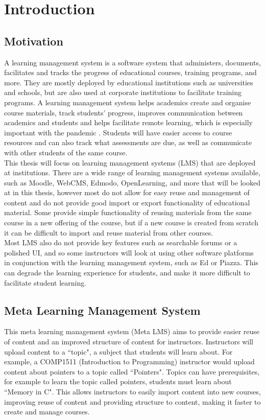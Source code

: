 \chapter{Introduction}\label{ch:intro}

\section{Motivation}
A learning management system is a software system that administers, documents, facilitates and tracks the progress of educational courses, training programs, and more. They are mostly deployed by educational institutions such as universities and schools, but are also used at corporate institutions to facilitate training programs\cite{lmsdefinition}. A learning management system helps academics create and organise course materials, track students' progress, improves communication between academics and students and helps facilitate remote learning, which is especially important with the pandemic \cite{lmsreasons}. Students will have easier access to course resources and can also track what assessments are due, as well as communicate with other students of the same course.\\

This thesis will focus on learning management systems (LMS) that are deployed at institutions. There are a wide range of learning management systems available, such as Moodle, WebCMS, Edmodo, OpenLearning, and more that will be looked at in this thesis, however most do not allow for easy reuse and management of content and do not provide good import or export functionality of educational material. Some provide simple functionality of reusing materials from the same course in a new offering of the course, but if a new course is created from scratch it can be difficult to import and reuse material from other courses.\\

Most LMS also do not provide key features such as searchable forums or a polished UI, and so some instructors will look at using other software platforms in conjunction with the learning management system, such as Ed or Piazza. This can degrade the learning experience for students, and make it more difficult to facilitate student learning.\\

\section{Meta Learning Management System}
This meta learning management system (Meta LMS) aims to provide easier reuse of content and an improved structure of content for instructors. Instructors will upload content to a ``topic", a subject that students will learn about. For example, a COMP1511 (Introduction to Programming) instructor would upload content about pointers to a topic called ``Pointers". Topics can have prerequisites, for example to learn the topic called pointers, students must learn about ``Memory in C". This allows instructors to easily import content into new courses, improving reuse of content and providing structure to content, making it faster to create and manage courses.\\

